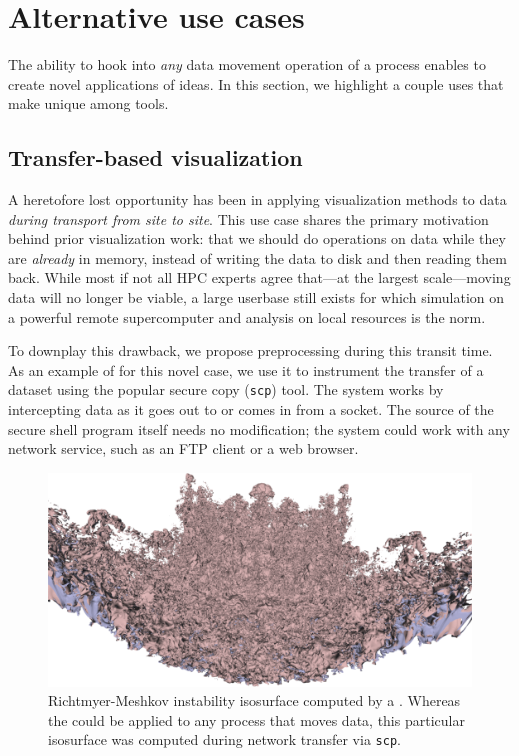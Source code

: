 \section{Alternative use cases}
\label{sec:novel}

The ability to hook into \emph{any} data movement operation of a
process enables \freeprocessing{} to create novel applications of
\insitu{} ideas.  In this section, we highlight a couple uses that make
\freeprocessing{} unique among \insitu{} tools.

\subsection{Transfer-based visualization}

A heretofore lost opportunity has been in applying visualization
methods to data \emph{during transport from site to site}.  This use
case shares
the primary motivation behind prior \insitu{} visualization work: that
we should do
operations on data while they are \emph{already} in memory, instead of
writing the data to disk and then reading them back. While most if not
all HPC experts agree that---at the largest scale---moving data will no
longer be viable, a large userbase still exists for which simulation on
a powerful remote supercomputer and analysis on local resources is the
norm.

To downplay this drawback, we propose preprocessing during this transit
time.  As an
example of \freeprocessing{} for this novel case, we use it to
instrument the transfer of a dataset using the popular secure copy
(\texttt{scp}) tool.  The system works by intercepting data as it goes
out to or comes in from a socket.  The source of the secure shell
program itself needs no modification; the system could work with any
network service, such as an FTP client or a web browser.

\begin{figure}
  \centering
  \includegraphics[width=\linewidth]{images/fp/rmeshkov-iso}

  \caption{Richtmyer-Meshkov instability isosurface computed by a
  \freeprocessor{}.  Whereas the \freeprocessor{} could be applied to
  any process that moves data, this particular isosurface was computed
  during network transfer via \texttt{scp}.}

  \label{fig:rm-iso}
\end{figure}

